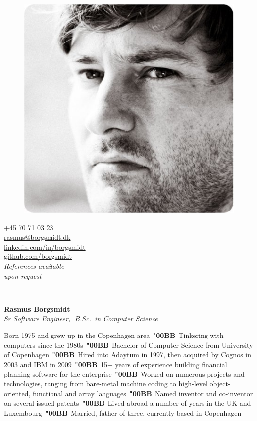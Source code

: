 \documentclass[a4paper,10pt,final]{memoir}
\newcommand{\Sep}{\vspace{1.5em}}
\newcommand{\Dot}{\mbox{\color{SpotColor}$\,\;$\textbf{\char"00BB}$\,\;$}}
\newenvironment{inlinepar}[1]
	{\ignorespaces{\lowsmallcapsspacing{\textbf{#1}}}}
	{\ignorespacesafterend}
\begin{document}
\begin{figure}
	\hfill
	\includegraphics[width=0.6\columnwidth]{../media/borgsmidt.jpg}
	\vspace{-7cm}
\end{figure}

\begin{flushright}\footnotesize
  +45 70 71 03 23\\
  \href{mailto:rasmus@borgsmidt.dk}{rasmus@borgsmidt.dk}\\
  \href{http://dk.linkedin.com/in/borgsmidt}{linkedin.com/in/borgsmidt}\\
  \href{https://github.com/borgsmidt}{github.com/borgsmidt}\\[12pt]
  {\em References available\\ upon request}
\end{flushright}\normalsize
\framebreak

\font%
\font%
\font=\font%

\huge{\textbf{Rasmus Borgsmidt}} \\
\Large{\color{SpotColor}\em Sr Software Engineer,$\;$ B.Sc.~in Computer Science}

\normalsize\normalfont

\Sep\begin{inlinepar}{about me}
  Born 1975 and grew up in the Copenhagen area\Dot Tinkering with computers
  since the 1980s\Dot Bachelor of Computer Science from University of
  Copenhagen\Dot Hired into Adaytum in 1997, then acquired by \mbox{Cognos} in
  2003 and IBM in 2009\Dot 15+ years of experience building financial planning
  software for the enterprise\Dot Worked on numerous projects and technologies,
  ranging from bare-metal machine coding to high-level object-oriented,
  functional and array languages\Dot Named inventor and co-inventor on several
  \mbox{issued} patents\Dot Lived abroad a number of years in the UK and
  Luxembourg\Dot Married, father of three, currently based in Copenhagen
\end{inlinepar}
\end{document}
